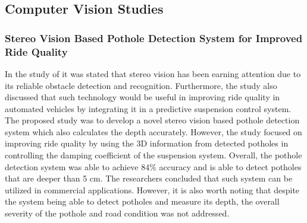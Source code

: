 \subsection{Computer Vision Studies}

\subsubsection{Stereo Vision Based Pothole Detection System for Improved Ride Quality}
In the study of  it was stated that stereo vision has been earning attention due to its reliable obstacle detection and recognition. Furthermore, the study also discussed that such technology would be useful in improving ride quality in automated vehicles by integrating it in a predictive suspension control system. The proposed study was to develop a novel stereo vision based pothole detection system which also calculates the depth accurately. However, the study focused on improving ride quality by using the 3D information from detected potholes in controlling the damping coefficient of the suspension system. Overall, the pothole detection system was able to achieve 84\% accuracy and is able to detect potholes that are deeper than 5 cm. The researchers concluded that such system can be utilized in commercial applications. However, it is also worth noting that despite the system being able to detect potholes and measure its depth, the overall severity of the pothole and road condition was not addressed.

\newpage
